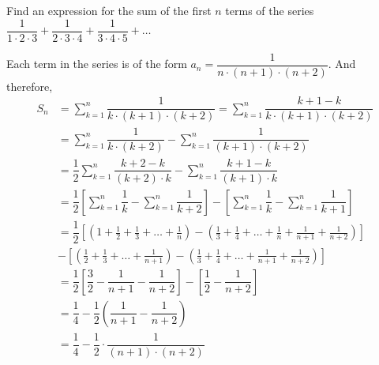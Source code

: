 

\printrubric

\question[4] Find an expression for the sum of the first $n$ terms of the series 
$\dfrac{1}{1\cdot 2\cdot 3} + \dfrac{1}{2\cdot 3\cdot 4} + \dfrac{1}{3\cdot 4\cdot 5} + \ldots$


\ifprintanswers
\fi 

\begin{solution}[\fullpage]
	Each term in the series is of the form $a_n = \dfrac{1}{n\cdot(n+1)\cdot(n+2)}$. And therefore,
	\begin{align}
		S_n &= \sum_{k=1}^{n}\dfrac{1}{k\cdot(k+1)\cdot(k+2)} 
		= \sum_{k=1}^{n}\dfrac{k+1-k}{k\cdot(k+1)\cdot(k+2)} \\
		&= \sum_{k=1}^{n}\dfrac{1}{k\cdot(k+2)} - \sum_{k=1}^{n}\dfrac{1}{(k+1)\cdot(k+2)} \\
		&= \dfrac{1}{2}\sum_{k=1}^{n}\dfrac{k+2-k}{(k+2)\cdot k} - \sum_{k=1}^{n}\dfrac{k+1-k}{(k+1)\cdot k} \\
		&= \dfrac{1}{2}\left[\sum_{k=1}^{n}\dfrac{1}{k} - \sum_{k=1}^{n}\dfrac{1}{k+2} \right] 
		- \left[ \sum_{k=1}^{n}\dfrac{1}{k} - \sum_{k=1}^{n}\dfrac{1}{k+1} \right] \\
		&= \dfrac{1}{2}\left[\left(1 + \frac{1}{2} + \frac{1}{3} + \ldots + \frac{1}{n} \right) 
		- \left( \frac{1}{3} + \frac{1}{4} + \ldots + \frac{1}{n} + \frac{1}{n+1} + \frac{1}{n+2}\right) 
		\right] \nonumber \\
		&- \left[\left( \frac{1}{2} + \frac{1}{3} + \ldots + \frac{1}{n+1}\right) 
		- \left( \frac{1}{3} + \frac{1}{4} + \ldots + \frac{1}{n+1} + \frac{1}{n+2} \right) \right]  \\
		&= \dfrac{1}{2}\left[ \dfrac{3}{2} - \dfrac{1}{n+1} - \dfrac{1}{n+2}\right] 
		- \left[\dfrac{1}{2} - \dfrac{1}{n+2} \right] \\
		&= \dfrac{1}{4} - \dfrac{1}{2}\left( \dfrac{1}{n+1} - \dfrac{1}{n+2}\right) \\
		&= \dfrac{1}{4} - \dfrac{1}{2}\cdot\dfrac{1}{(n+1)\cdot(n+2)}
	\end{align}
\end{solution}


